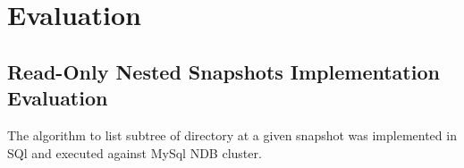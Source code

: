 
%
%
%

\chapter{Evaluation}
\label{ch:evaluation}
\section{Read-Only Nested Snapshots Implementation Evaluation}

The algorithm to list subtree of directory at a given snapshot was implemented in SQl and executed against MySql NDB cluster. 
